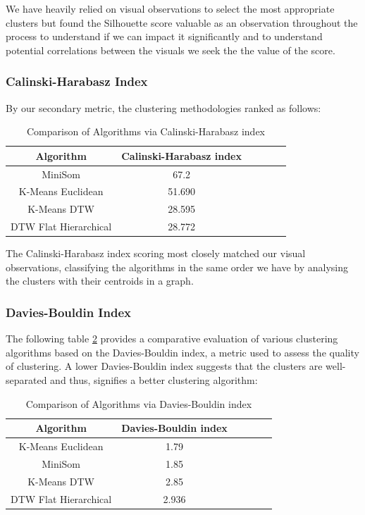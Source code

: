 \documentclass[11pt]{article}
\begin{document}
We have heavily relied on visual observations to select the most appropriate clusters but found the Silhouette score valuable as an observation throughout the process to understand if we can impact it significantly and to understand potential correlations between the visuals we seek the the value of the score.

\subsubsection{Calinski-Harabasz Index}

By our secondary metric, the clustering methodologies ranked as follows:
\begin{table}[H]
\centering
\begin{tabular}{|c|c|c|c|c|c|}
\hline
\textbf{Algorithm} & \textbf{Calinski-Harabasz index} \\
\hline
MiniSom & 67.2 \\
K-Means Euclidean & 51.690 \\
K-Means DTW & 28.595\\
DTW Flat Hierarchical & 28.772 \\
\hline
\end{tabular}
\caption{Comparison of Algorithms via Calinski-Harabasz index}
\label{tab:calinski_score}
\end{table}

The Calinski-Harabasz index scoring most closely matched our visual observations, classifying the algorithms in the same order we have by analysing the clusters with their centroids in a graph.

    
\subsubsection{Davies-Bouldin Index}

The following table \ref{tab:davies_score} provides a comparative evaluation of various clustering algorithms based on the Davies-Bouldin index, a metric used to assess the quality of clustering. A lower Davies-Bouldin index suggests that the clusters are well-separated and thus, signifies a better clustering algorithm:

\begin{table}[H]
\centering
\begin{tabular}{|c|c|c|c|c|c|}
\hline
\textbf{Algorithm} & \textbf{Davies-Bouldin index} \\
\hline
K-Means Euclidean & 1.79 \\
MiniSom & 1.85 \\
K-Means DTW & 2.85\\
DTW Flat Hierarchical & 2.936 \\
\hline
\end{tabular}
\caption{Comparison of Algorithms via Davies-Bouldin index}
\label{tab:davies_score}
\end{table}
\end{document}
